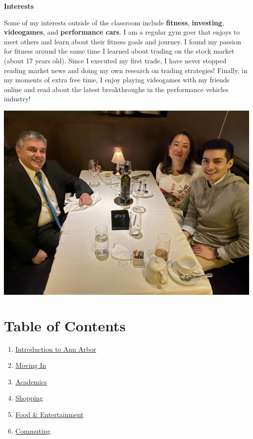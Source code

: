 \documentclass[
]{book}
\providecommand{\tightlist}{%
  \setlength{\itemsep}{0pt}\setlength{\parskip}{0pt}}
\begin{document}
\textbf{Interests}

Some of my interests outside of the classroom include \textbf{fitness}, \textbf{investing}, \textbf{videogames}, and \textbf{performance cars}. I am a regular gym goer that enjoys to meet others and learn about their fitness goals and journey. I found my passion for fitness around the same time I learned about trading on the stock market (about 17 years old). Since I executed my first trade, I have never stopped reading market news and doing my own research on trading strategies! Finally, in my moments of extra free time, I enjoy playing videogames with my friends online and read about the latest breakthroughs in the performance vehicles industry!

\includegraphics{About_Me_Photo.jpeg}

\hypertarget{table-of-contents}{%
\chapter*{Table of Contents}\label{table-of-contents}}

\begin{enumerate}
\def\labelenumi{\arabic{enumi}.}
\tightlist
\item
  \protect\hyperlink{introduction}{Introduction to Ann Arbor}
\item
  \protect\hyperlink{move-in}{Moving In}
\item
  \protect\hyperlink{academics}{Academics}
\item
  \protect\hyperlink{shopping}{Shopping}
\item
  \protect\hyperlink{food-entertainment}{Food \& Entertainment}
\item
  \protect\hyperlink{commuting}{Commuting}
\end{enumerate}
\end{document}
